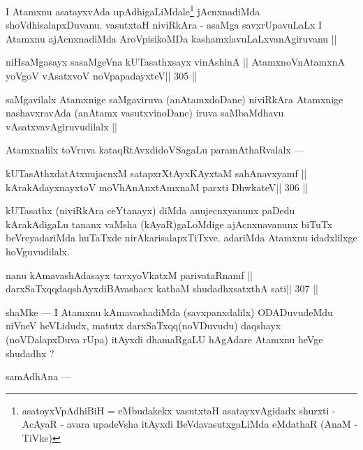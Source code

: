 \begin{artha}
I Atamxnu asatayxvAda upAdhigaLiMdale\footnote[1]{asatoyxVpAdhiBiH = 
eMbudakekx vasutxtaH asatayxvAgidadx shurxti - AcAyaR - avara upadeVsha itAyxdi BeVdavasutxgaLiMda eMdathaR (AnaM - TiVke)} jAcnxnadiMda shoVdhisalapxDuvanu. vasutxtaH niviRkAra - asaMga savxrUpavuLaLx I Atamxnu ajAcnxnadiMda AroVpisikoMDa kashamxlavuLaLxvanAgiruvanu ||
\end{artha}

\begin{shl}
niHsaMgasayx sasaMgeVna kUTasathxsayx vinAshinA ||
AtamxnoV\s nAtamxnA yoVgoV vAsatxvoV noVpapadayxteV\hfill || 305 ||
\end{shl}

\begin{artha}
saMgavilalx Atamxnige saMgaviruva (anAtamxdoDane) niviRkAra Atamxnige nashavxravAda (anAtamx vasutxvinoDane) iruva saMbaMdhavu vAsatxvavAgiruvudilalx ||
\end{artha}

\begin{artha}
Atamxnalilx toVruva kataqRtAvxdidoVSagaLu paramAthaRvalalx ---
\end{artha}

\begin{shl}
kUTasAthxdatAtxnujacnxM satapxrXtAyxKAyxtaM sahAnavxyamf ||
kArakAdayxnayxtoV moVhAnAnx\s\s tAmxnaM parxti DhwkateV\hfill || 306 ||
\end{shl}

\begin{artha}
kUTasathx (niviRkAra ceYtanayx) diMda anujecnxyanunx paDedu 
kArakAdigaLu tananx vaMsha (kAyaR)gaLoMdige ajAcnxnavanunx biTuTx beVreyadariMda huTaTxde nirAkarisalapxTiTxve. adariMda Atamxnu idadxlilxge hoVguvudilalx.
\end{artha}

\begin{shl}
nanu kAmavashAdasayx tavxyoVkatxM parivataRnamf ||
darxSaTxqqdaqshAyxdiBAvashacx kathaM shudadhxsatxthA sati\hfill || 307 ||
\end{shl}

\begin{artha}
shaMke --- I Atamxnu kAmavashadiMda (savxpanxdalilx) ODADuvudeMdu 
niVneV heVLidudx, matutx darxSaTxqq(noVDuvudu) daqshayx (noVDalapxDuva rUpa) itAyxdi dhamaRgaLU hAgAdare Atamxnu heVge shudadhx ?
\end{artha}

\begin{artha}
samAdhAna ---
\end{artha}

